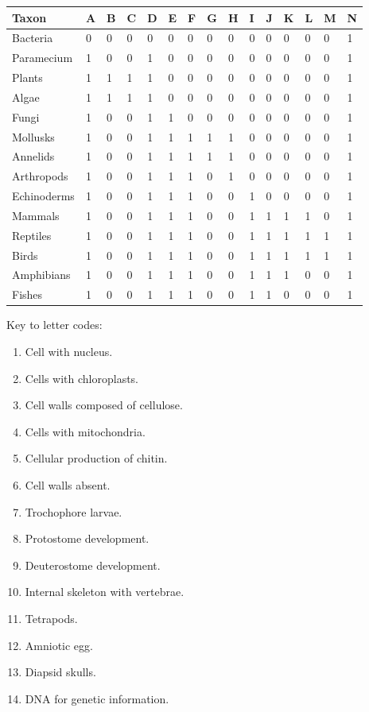 \documentclass[12pt, hidelinks]{exam}
\begin{document}
\begin{landscape}

\begin{longtable}{@{}L{1in}L{0.25in}L{0.25in}L{0.25in}L{0.25in}L{0.25in}L{0.25in}L{0.25in}L{0.25in}L{0.25in}L{0.25in}L{0.25in}L{0.25in}L{0.25in}L{0.25in}@{}}
\toprule
Taxon		& A	& B	& C	& D	& E	& F	& G	& H	& I	& J	& K	& L	& M & N	\tabularnewline
\midrule
Bacteria	& 0	& 0	& 0	& 0	& 0	& 0	& 0	& 0	& 0	& 0	& 0	& 0	& 0 & 1	\tabularnewline
Paramecium	& 1	& 0	& 0	& 1	& 0	& 0	& 0	& 0	& 0	& 0	& 0	& 0	& 0 & 1	\tabularnewline
Plants		& 1	& 1	& 1	& 1	& 0	& 0	& 0	& 0	& 0	& 0	& 0	& 0	& 0 & 1	\tabularnewline
Algae		& 1	& 1	& 1	& 1	& 0	& 0	& 0	& 0	& 0	& 0	& 0	& 0	& 0 & 1	\tabularnewline
Fungi		& 1	& 0	& 0	& 1	& 1	& 0	& 0	& 0	& 0	& 0	& 0	& 0	& 0 & 1	\tabularnewline
Mollusks	& 1	& 0	& 0	& 1	& 1	& 1	& 1	& 1	& 0	& 0	& 0	& 0	& 0 & 1	\tabularnewline
Annelids	& 1	& 0	& 0	& 1	& 1	& 1	& 1	& 1	& 0	& 0	& 0	& 0	& 0 & 1	\tabularnewline
Arthropods	& 1	& 0	& 0	& 1	& 1	& 1	& 0	& 1	& 0	& 0	& 0	& 0	& 0 & 1	\tabularnewline
Echinoderms	& 1	& 0	& 0	& 1	& 1	& 1	& 0	& 0	& 1	& 0	& 0	& 0	& 0 & 1	\tabularnewline
Mammals		& 1	& 0	& 0	& 1	& 1	& 1	& 0	& 0	& 1	& 1	& 1	& 1	& 0 & 1	\tabularnewline
Reptiles	& 1	& 0	& 0	& 1	& 1	& 1	& 0	& 0	& 1	& 1	& 1	& 1	& 1 & 1	\tabularnewline
Birds		& 1	& 0	& 0	& 1	& 1	& 1	& 0	& 0	& 1	& 1	& 1	& 1	& 1 & 1	\tabularnewline
Amphibians	& 1	& 0	& 0	& 1	& 1	& 1	& 0	& 0	& 1	& 1	& 1	& 0	& 0 & 1	\tabularnewline
Fishes		& 1	& 0	& 0	& 1	& 1	& 1	& 0	& 0	& 1	& 1	& 0	& 0	& 0 & 1	\tabularnewline

\bottomrule
\end{longtable}\label{presence_table}

Key to letter codes:

\begin{multicols}{3}
	\raggedcolumns
	\begin{enumerate}
		\item Cell with nucleus.
		\item Cells with chloroplasts.
		\item Cell walls composed of cellulose.
		\item Cells with mitochondria.
		\item Cellular production of chitin.
		\item Cell walls absent.
		\item Trochophore larvae.
		\item Protostome development.
		\item Deuterostome development.
		\item Internal skeleton with vertebrae.
		\item Tetrapods.
		\item Amniotic egg.
		\item Diapsid skulls.
		\item DNA for genetic information.
	\end{enumerate}
\end{multicols}



\end{landscape}
\end{document}
